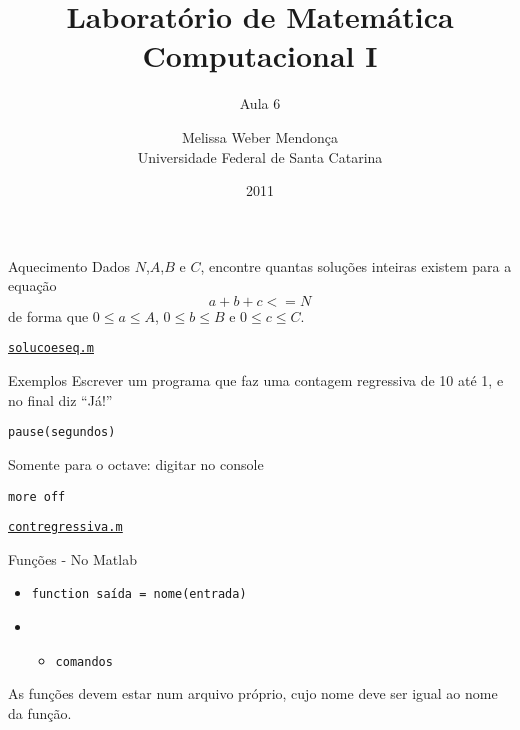 \documentclass[hyperref={pdfpagelabels=false}]{beamer}
\title{Laboratório de Matemática Computacional I}
\subtitle{Aula 6}
\author[M. Weber Mendonça]{Melissa Weber Mendonça\\
Universidade Federal de Santa Catarina}
\date{2011}
\begin{document}
\setmonofont{Inconsolata}

\begin{frame}
  \titlepage
\end{frame}

\begin{frame}{Aquecimento}
  Dados $N$,$A$,$B$ e $C$, encontre quantas soluções inteiras existem para a equação 
  $$a + b + c <= N$$
  de forma que $0 \leq a \leq A$, $0 \leq b \leq B$ e $0 \leq c \leq C$.
  
  \begin{center} \href{listings/solucoeseq.m}{\underline{\texttt{solucoeseq.m}}} \end{center}
\end{frame}

\begin{frame}{Exemplos}
  Escrever um programa que faz uma contagem regressiva de 10 até 1, e no final diz ``Já!''
  \begin{center} {\texttt{pause(segundos)}} \end{center}
  Somente para o octave: digitar no console
  \begin{center}{\texttt{more off}} \end{center}
  
  \begin{center} \href{listings/contregressiva.m}{\underline{\texttt{contregressiva.m}}} \end{center}
\end{frame}

\begin{frame}{Funções - No Matlab}
  \begin{itemize}
  \item[] \texttt{function \alert{saída} = \alert{nome}(\alert{entrada})}
  \item[]  \begin{itemize}
  \item[] \texttt{\alert{comandos}}
  \end{itemize}
  \end{itemize}
  
  As funções devem estar num arquivo próprio, cujo nome deve ser igual ao nome da função.
\end{frame}
\end{document}
